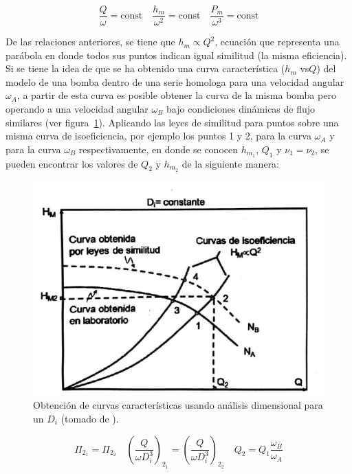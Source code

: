\documentclass[11pt, oneside]{article}
\begin{document}
\begin{equation}
\frac{Q}{\omega} = \text{const} \quad \frac{h_m}{\omega^2}= \text{const}  \quad \frac{P_m}{\omega^3}= \text{const} 
\label{boma7}
\end{equation}

De las relaciones anteriores, se tiene que $h_m \propto Q^2$, ecuaci\'on que representa una par\'abola en donde todos sus puntos indican igual similitud (la misma eficiencia). Si se tiene la idea de que se ha obtenido una curva caracter\'istica ($h_m$ vs$Q$) del modelo de una bomba dentro de una serie homologa para una velocidad angular $\omega_A$, a partir de esta curva es posible obtener la curva de la misma bomba pero operando a una velocidad angular $\omega_B$ bajo condiciones din\'amicas de flujo similares (ver figura~\ref{bom8}). Aplicando las leyes de similitud para puntos sobre una misma curva de isoeficiencia, por ejemplo los puntos 1 y 2, para la curva $\omega_A$ y para la curva $\omega_B$ respectivamente, en donde se conocen $h_{m_1}$, $Q_1$ y $\nu_1 = \nu_2$, se pueden encontrar los valores de $Q_2$ y $h_{m_2}$ de la siguiente manera:

\begin{figure}[h]
\centering
\includegraphics[width=12cm]{./figs/bom8.jpeg}
\caption{Obtenci\'on de curvas caracter\'isticas usando an\'alisis dimensional para un $D_i$ (tomado de \cite{agudelo2011mecanica}).} 
\label{bom8}
\end{figure}


\begin{equation}
\Pi_{2_1} = \Pi_{2_2} \quad \left( \frac{Q}{\omega D_i^3} \right)_{2_1} = \left( \frac{Q}{\omega D_i^3} \right)_{2_2} \quad Q_2 = Q_1 \frac{\omega_B}{\omega_A}
\label{boma8}
\end{equation}
\end{document}
